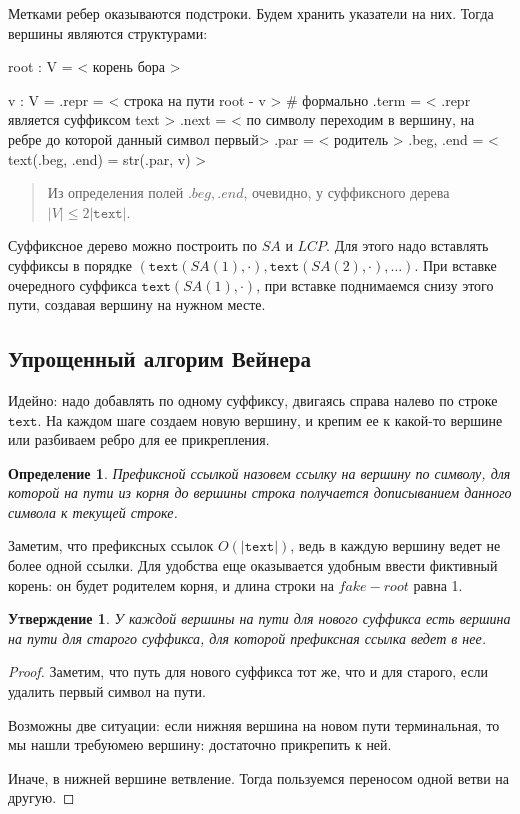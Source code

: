 \documentclass[10pt]{book}
\theoremstyle{plain}
\newtheorem{stm}{Утверждение}[section]
\newtheorem{definition}{Определение}[section]
\newcommand{\textm}{\texttt{text}}
\begin{document}
Метками ребер оказываются подстроки. Будем хранить указатели на них. Тогда
вершины являются структурами:
\begin{verbm}
  root : V = < корень бора >
  
  v : V = {
    .repr = < строка на пути root - v >  # формально
    .term = < .repr является суффиксом text >
    .next = < по символу переходим в вершину,
              на ребре до которой данный символ первый>
    .par = < родитель >
    .beg, .end = < text(.beg, .end) = str(.par, v) >
  }
\end{verbm}

\begin{quote}
  Из определения полей $.beg, .end$, очевидно, у суффиксного дерева
  $|V| \le 2|\textm|$.
\end{quote}

Суффиксное дерево можно построить по $SA$ и $LCP$. Для этого надо вставлять
суффиксы в порядке $(\textm(SA(1), \cdot), \textm(SA(2), \cdot), \ldots)$.
При вставке очередного суффикса $\textm(SA(1), \cdot)$, при вставке поднимаемся
снизу этого пути, создавая вершину на нужном месте.

\subsection{Упрощенный алгорим Вейнера}

Идейно: надо добавлять по одному суффиксу, двигаясь справа налево по строке
$\textm$. На каждом шаге создаем новую вершину, и крепим ее к какой-то вершине
или разбиваем ребро для ее прикрепления.

\begin{definition}
  Префиксной ссылкой назовем ссылку на вершину по символу, для которой на пути
  из корня до вершины строка получается дописыванием данного символа к текущей
  строке.
\end{definition}

Заметим, что префиксных ссылок $O(|\textm|)$, ведь в каждую вершину ведет не
более одной ссылки. Для удобства еще оказывается удобным ввести фиктивный
корень: он будет родителем корня, и длина строки на $fake-root$ равна 1.

\begin{stm}
  У каждой вершины на пути для нового суффикса есть вершина на пути для
  старого суффикса, для которой префиксная ссылка ведет в нее.
\end{stm}
\begin{proof}
  Заметим, что путь для нового суффикса тот же, что и для старого, если
  удалить первый символ на пути.

  Возможны две ситуации: если нижняя вершина на новом пути терминальная, то
  мы нашли требуюмею вершину: достаточно прикрепить к ней.

  Иначе, в нижней вершине ветвление. Тогда пользуемся переносом одной ветви на
  другую.
\end{proof}
\end{document}
